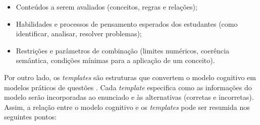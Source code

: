 \begin{itemize} \item Conteúdos a serem avaliados (conceitos, regras e relações); \item Habilidades e processos de pensamento esperados dos estudantes (como identificar, analisar, resolver problemas); \item Restrições e parâmetros de combinação (limites numéricos, coerência semântica, condições mínimas para a aplicação de um conceito). \end{itemize}





Por outro lado, os \textit{templates} são estruturas que convertem o modelo cognitivo em modelos práticos de questões \cite{gierl2024}. Cada \textit{template} especifica como as informações do modelo serão incorporadas ao enunciado e às alternativas (corretas e incorretas). Assim, a relação entre o modelo cognitivo e os \textit{templates} pode ser resumida nos seguintes pontos:


